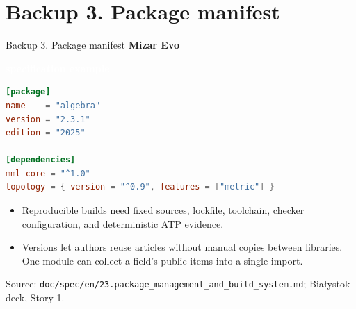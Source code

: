 \documentclass[aspectratio=169,11pt]{beamer}
\newcommand{\statusbadge}[2]{\colorbox{#1}{\textcolor{white}{\strut\scriptsize\sffamily\bfseries #2}}}
\newcommand{\badgeSpec}{\statusbadge{green!35!black}{specification example}}
\begin{document}
\section{Backup 3. Package manifest}
\begin{frame}[fragile,t]{Backup 3. Package manifest}
\smallskip
\textbf{Mizar Evo}~\badgeSpec
\begin{lstlisting}[language={toml},basicstyle=\ttfamily\footnotesize]
[package]
name    = "algebra"
version = "2.3.1"
edition = "2025"

[dependencies]
mml_core = "^1.0"
topology = { version = "^0.9", features = ["metric"] }
\end{lstlisting}
\begin{itemize}
\setlength{\itemsep}{1pt}
\setlength{\parsep}{0pt}
\setlength{\parskip}{0pt}
\item Reproducible builds need fixed sources, lockfile, toolchain, checker configuration, and deterministic ATP evidence.
\item Versions let authors reuse articles without manual copies between libraries. One module can collect a field's public items into a single import.
\end{itemize}
Source: \texttt{doc/spec/en/23.package\_management\_and\_build\_system.md}; Bia\l{}ystok deck, Story 1.

\end{frame}
\end{document}
